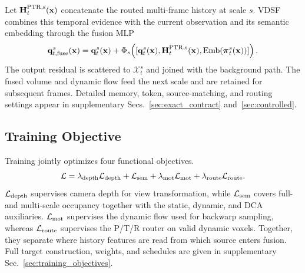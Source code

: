\documentclass{article}
\newcommand{\figdir}{figures}
\begin{document}
\mainresultstable
Let $\mathbf H_t^{\rm PTR,s}(\mathbf x)$ concatenate the routed multi-frame
history at scale $s$. VDSF combines this temporal evidence with
the current observation and its semantic embedding through the fusion MLP
\begin{equation}
 \mathbf q_{t,\rm fuse}^s(\mathbf x)=\mathbf q_t^s(\mathbf x)+
 \Phi_s\!\left([\mathbf q_t^s(\mathbf x),
 \mathbf H_t^{\rm PTR,s}(\mathbf x),
 \operatorname{Emb}(\boldsymbol\pi_t^s(\mathbf x))]\right).
 \label{eq:vdsf_fusion}
\end{equation}
The output residual is scattered to $\mathcal X_t^s$ and joined with the
background path. The fused volume and dynamic flow feed the next scale and are
retained for subsequent frames. Detailed memory, token, source-matching, and
routing settings appear in supplementary Secs.~\ref{sec:exact_contract}
and~\ref{sec:controlled}.


\subsection{Training Objective}
\label{sec:objective}

Training jointly optimizes four functional objectives.
\begin{equation}
  \mathcal L=\lambda_{\rm depth}\mathcal L_{\rm depth}+
  \mathcal L_{\rm sem}+
  \lambda_{\rm mot}\mathcal L_{\rm mot}+
  \lambda_{\rm route}\mathcal L_{\rm route}.
  \label{eq:loss}
\end{equation}
$\mathcal L_{\rm depth}$ supervises camera depth for view transformation, while
$\mathcal L_{\rm sem}$ covers full- and multi-scale occupancy together with the
static, dynamic, and DCA auxiliaries. $\mathcal L_{\rm mot}$ supervises
the dynamic flow used for backwarp sampling, whereas $\mathcal L_{\rm route}$
supervises the P/T/R router on valid dynamic voxels. Together, they separate
where history features are read from which source enters fusion. Full target
construction, weights, and schedules are given in supplementary
Sec.~\ref{sec:training_objectives}.

\end{document}
